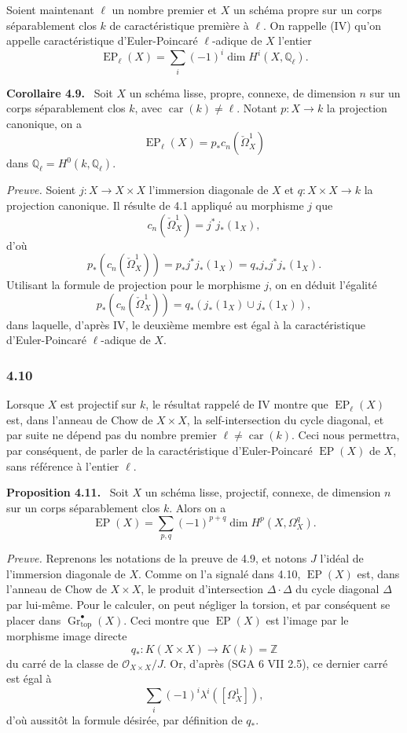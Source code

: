 \documentclass[11pt]{article}
\newenvironment{statement}[1]{\par\medskip\noindent\textbf{#1.}\ }{\par\medskip}
\begin{document}
Soient maintenant $\ell$ un nombre premier et $X$ un schéma propre sur un corps séparablement clos $k$ de caractéristique première à $\ell$. On rappelle (IV) qu'on appelle caractéristique d'Euler-Poincaré $\ell$-adique de $X$ l'entier
\[
\operatorname{EP}_\ell(X)=\sum_i(-1)^i\dim H^i(X,\mathbb Q_\ell).
\]

\begin{statement}{Corollaire 4.9}
Soit $X$ un schéma lisse, propre, connexe, de dimension $n$ sur un corps séparablement clos $k$, avec $\operatorname{car}(k)\ne\ell$. Notant $p:X\to k$ la projection canonique, on a
\[
\operatorname{EP}_\ell(X)=p_*c_n(\check\Omega^1_X)
\]
dans $\mathbb Q_\ell=H^0(k,\mathbb Q_\ell)$.
\end{statement}

\emph{Preuve.} Soient $j:X\to X\times X$ l'immersion diagonale de $X$ et $q:X\times X\to k$ la projection canonique. Il résulte de 4.1 appliqué au morphisme $j$ que
\[
c_n(\check\Omega^1_X)=j^*j_*(1_X),
\]
d'où
\[
p_*(c_n(\check\Omega^1_X))=p_*j^*j_*(1_X)=q_*j_*j^*j_*(1_X).
\]
Utilisant la formule de projection pour le morphisme $j$, on en déduit l'égalité
\[
p_*(c_n(\check\Omega^1_X))=q_*(j_*(1_X)\cup j_*(1_X)),
\]
dans laquelle, d'après IV, le deuxième membre est égal à la caractéristique d'Euler-Poincaré $\ell$-adique de $X$.

\subsubsection*{4.10}
Lorsque $X$ est projectif sur $k$, le résultat rappelé de IV montre que $\operatorname{EP}_\ell(X)$ est, dans l'anneau de Chow de $X\times X$, la self-intersection du cycle diagonal, et par suite ne dépend pas du nombre premier $\ell\ne\operatorname{car}(k)$. Ceci nous permettra, par conséquent, de parler de la caractéristique d'Euler-Poincaré $\operatorname{EP}(X)$ de $X$, sans référence à l'entier $\ell$.

\begin{statement}{Proposition 4.11}
Soit $X$ un schéma lisse, projectif, connexe, de dimension $n$ sur un corps séparablement clos $k$. Alors on a
\[
\operatorname{EP}(X)=\sum_{p,q}(-1)^{p+q}\dim H^p(X,\Omega_X^q).
\]
\end{statement}

\emph{Preuve.} Reprenons les notations de la preuve de 4.9, et notons $J$ l'idéal de l'immersion diagonale de $X$. Comme on l'a signalé dans 4.10, $\operatorname{EP}(X)$ est, dans l'anneau de Chow de $X\times X$, le produit d'intersection $\Delta\cdot\Delta$ du cycle diagonal $\Delta$ par lui-même. Pour le calculer, on peut négliger la torsion, et par conséquent se placer dans $\operatorname{Gr}_{\mathrm{top}}^\bullet(X)$. Ceci montre que $\operatorname{EP}(X)$ est l'image par le morphisme image directe
\[
q_*:K(X\times X)\to K(k)=\mathbb Z
\]
du carré de la classe de $\mathcal O_{X\times X}/J$. Or, d'après (SGA 6 VII 2.5), ce dernier carré est égal à
\[
\sum_i(-1)^i\lambda^i([\Omega_X^1]),
\]
d'où aussitôt la formule désirée, par définition de $q_*$.
\end{document}
